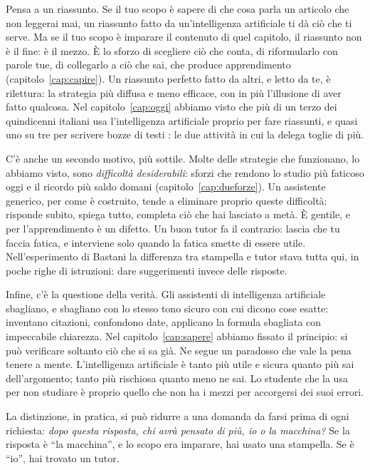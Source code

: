 Pensa a un riassunto. Se il tuo scopo è sapere di che cosa parla un
articolo che non leggerai mai, un riassunto fatto da un'intelligenza
artificiale ti dà ciò che ti serve. Ma se il tuo scopo è imparare il
contenuto di quel capitolo, il riassunto non è il fine: è il mezzo. È
lo sforzo di scegliere ciò che conta, di riformularlo con parole tue,
di collegarlo a ciò che sai, che produce apprendimento
(capitolo~\ref{cap:capire}). Un riassunto perfetto fatto da altri, e
letto da te, è rilettura: la strategia più diffusa e meno efficace, con
in più l'illusione di aver fatto qualcosa. Nel
capitolo~\ref{cap:oggi} abbiamo visto che più di un terzo dei
quindicenni italiani usa l'intelligenza artificiale proprio per fare
riassunti, e quasi uno su tre per scrivere bozze di testi
\parencite{oecd2026pisa}: le due attività in cui la delega toglie di
più.

C'è anche un secondo motivo, più sottile. Molte delle strategie che
funzionano, lo abbiamo visto, sono \emph{difficoltà desiderabili}:
sforzi che rendono lo studio più faticoso oggi e il ricordo più saldo
domani (capitolo~\ref{cap:dueforze}). Un assistente generico, per come
è costruito, tende a eliminare proprio queste difficoltà: risponde
subito, spiega tutto, completa ciò che hai lasciato a metà. È gentile,
e per l'apprendimento è un difetto. Un buon tutor fa il contrario:
lascia che tu faccia fatica, e interviene solo quando la fatica smette
di essere utile. Nell'esperimento di Bastani la differenza tra
stampella e tutor stava tutta qui, in poche righe di istruzioni: dare
suggerimenti invece delle risposte.

Infine, c'è la questione della verità. Gli assistenti di intelligenza
artificiale sbagliano, e sbagliano con lo stesso tono sicuro con cui
dicono cose esatte: inventano citazioni, confondono date, applicano la
formula sbagliata con impeccabile chiarezza. Nel
capitolo~\ref{cap:sapere} abbiamo fissato il principio: si può
verificare soltanto ciò che si sa già. Ne segue un paradosso che vale
la pena tenere a mente. L'intelligenza artificiale è tanto più utile e
sicura quanto più sai dell'argomento; tanto più rischiosa quanto meno
ne sai. Lo studente che la usa per non studiare è proprio quello che
non ha i mezzi per accorgersi dei suoi errori.

La distinzione, in pratica, si può ridurre a una domanda da farsi prima
di ogni richiesta: \emph{dopo questa risposta, chi avrà pensato di
più, io o la macchina?} Se la risposta è \enquote{la macchina}, e lo
scopo era imparare, hai usato una stampella. Se è \enquote{io}, hai
trovato un tutor.

